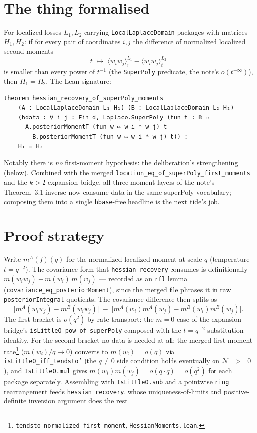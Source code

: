 \documentclass[11pt]{article}
\begin{document}
\section{The thing formalised}

For localized losses $L_1, L_2$ carrying \texttt{LocalLaplaceDomain}
packages with matrices $H_1, H_2$: if for every pair of coordinates $i,j$
the difference of normalized localized second moments
\[
t \;\longmapsto\;
\langle w_i w_j \rangle^{L_1}_t - \langle w_i w_j \rangle^{L_2}_t
\]
is smaller than every power of $t^{-1}$ (the \texttt{SuperPoly} predicate,
the note's $o(t^{-\infty})$), then $H_1 = H_2$. The Lean signature:

{\small
\begin{verbatim}
theorem hessian_recovery_of_superPoly_moments
    (A : LocalLaplaceDomain L₁ H₁) (B : LocalLaplaceDomain L₂ H₂)
    (hdata : ∀ i j : Fin d, Laplace.SuperPoly (fun t : ℝ ↦
      A.posteriorMomentT (fun w ↦ w i * w j) t -
        B.posteriorMomentT (fun w ↦ w i * w j) t)) :
    H₁ = H₂
\end{verbatim}
}

Notably there is \emph{no} first-moment hypothesis: the deliberation's
strengthening (below). Combined with the merged
\texttt{location\_eq\_of\_superPoly\_first\_moments} and the $k>2$
expansion bridge, all three moment layers of the note's Theorem~3.1 inverse
now consume data in the same superPoly vocabulary; composing them into a
single \texttt{hbase}-free headline is the next tide's job.

\section{Proof strategy}

Write $m^A(f)(q)$ for the normalized localized moment at scale $q$
(temperature $t = q^{-2}$). The covariance form that
\texttt{hessian\_recovery} consumes is definitionally
$m(w_iw_j) - m(w_i)\,m(w_j)$ --- recorded as an \texttt{rfl} lemma
(\texttt{covariance\_eq\_posteriorMoment}), since the merged file phrases it
in raw \texttt{posteriorIntegral} quotients. The covariance difference then
splits as
\[
\bigl[m^A(w_iw_j) - m^B(w_iw_j)\bigr]
\;-\;
\bigl[m^A(w_i)m^A(w_j) - m^B(w_i)m^B(w_j)\bigr].
\]
The first bracket is $o(q^2)$ by rate transport: the $m = 0$ case of the
expansion bridge's \texttt{isLittleO\_pow\_of\_superPoly} composed with the
$t = q^{-2}$ substitution identity. For the second bracket no data is
needed at all: the merged first-moment rate\footnote{%
\texttt{tendsto\_normalized\_first\_moment}, \texttt{HessianMoments.lean}.}
($m(w_i)/q \to 0$) converts to
$m(w_i) =o(q)$ via \texttt{isLittleO\_iff\_tendsto'} (the $q \neq 0$ side
condition holds eventually on $\mathcal{N}[>]0$), and
\texttt{IsLittleO.mul} gives $m(w_i)m(w_j) = o(q\cdot q) = o(q^2)$ for each
package separately. Assembling with \texttt{IsLittleO.sub} and a pointwise
\texttt{ring} rearrangement feeds \texttt{hessian\_recovery}, whose
uniqueness-of-limits and positive-definite inversion argument does the
rest.
\end{document}
